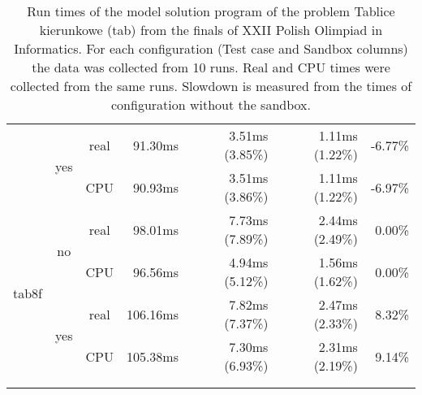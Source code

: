 \documentclass[en]{pracamgr}
\begin{document}
\begin{appendices}
\begin{small}
\begin{longtable}{|l|c|c|r|r|r|r|}
                          \cline{2-7}
                          & \multirow{2}{*}{yes} & real & 91.30ms & 3.51ms (3.85\%) & 1.11ms (1.22\%) & -6.77\% \\*
                          &                      & CPU  & 90.93ms & 3.51ms (3.86\%) & 1.11ms (1.22\%) & -6.97\% \\
\hline
\multirow{4}{*}{tab8f}    & \multirow{2}{*}{no}  & real & 98.01ms & 7.73ms (7.89\%) & 2.44ms (2.49\%) & 0.00\% \\*
                          &                      & CPU  & 96.56ms & 4.94ms (5.12\%) & 1.56ms (1.62\%) & 0.00\% \\*
                          \cline{2-7}
                          & \multirow{2}{*}{yes} & real & 106.16ms & 7.82ms (7.37\%) & 2.47ms (2.33\%) & 8.32\% \\*
                          &                      & CPU  & 105.38ms & 7.30ms (6.93\%) & 2.31ms (2.19\%) & 9.14\% \\
\hline
\multicolumn{1}{c}{}\\ %
\caption{Run times of the model solution program of the problem Tablice kierunkowe (tab) from the finals of XXII Polish Olimpiad in Informatics. For each configuration (Test case and Sandbox columns) the data was collected from 10 runs. Real and CPU times were collected from the same runs. Slowdown is measured from the times of configuration without the sandbox.}
\label{table:tab_model_solution_runtimes}
\end{longtable}
\end{small}


\end{appendices}
\end{document}

